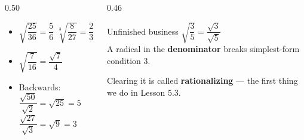 \documentclass[aspectratio=169, 11pt]{beamer}
\begin{document}
\begin{frame}[t, plain]
  \begin{columns}[T]
    \begin{column}{0.50\textwidth}
      \footnotesize
      \begin{itemize}\setlength{\itemsep}{6pt}
        \item $\sqrt{\dfrac{25}{36}}=\dfrac{5}{6}$ \qquad
              $\sqrt[3]{\dfrac{8}{27}}=\dfrac{2}{3}$
        \item $\sqrt{\dfrac{7}{16}}=\dfrac{\sqrt7}{4}$
        \item Backwards: $\dfrac{\sqrt{50}}{\sqrt2}=\sqrt{25}=5$ \\[3pt]
              \qquad\qquad\quad $\dfrac{\sqrt{27}}{\sqrt3}=\sqrt9=3$
      \end{itemize}
    \end{column}
    \begin{column}{0.46\textwidth}
      \begin{block}{Unfinished business}
        $\sqrt{\dfrac{3}{5}}=\dfrac{\sqrt3}{\sqrt5}$ \\[4pt]
        {\footnotesize A radical in the \textbf{denominator} breaks simplest-form condition 3.}
      \end{block}
      \vspace{3pt}
      {\footnotesize Clearing it is called \textbf{rationalizing} --- the first thing we do in
      Lesson 5.3.}
    \end{column}
  \end{columns}
\end{frame}
\end{document}
